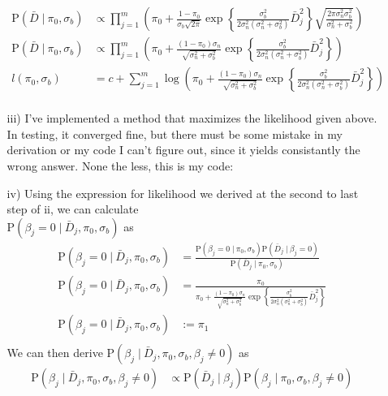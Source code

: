 \documentclass[11pt]{article}
\newcommand{\p}{\mathrm{P}}
\newcommand{\st}{ \; \big | \:}
\theoremstyle{definition}
\begin{document}
\begin{itemize}
\begin{itemize}
\begin{align*}
                    \p(\bar D\st \pi_0,\sigma_b) &\propto \prod_{j=1}^m\left(\pi_0 + \frac{1-\pi_0}{\sigma_b\sqrt{2\pi}}\exp\left\{\frac{\sigma_b^2}{2\sigma_n^2(\sigma_n^2+\sigma_b^2)}\bar D_j^2\right\}  \sqrt{\frac{2\pi\sigma_n^2\sigma_b^2}{\sigma_n^2+\sigma_b^2}}\right) \\
                    \p(\bar D\st \pi_0,\sigma_b) &\propto \prod_{j=1}^m\left(\pi_0 + \frac{(1-\pi_0)\sigma_n}{\sqrt{\sigma_n^2+\sigma_b^2}}\exp\left\{\frac{\sigma_b^2}{2\sigma_n^2(\sigma_n^2+\sigma_b^2)}\bar D_j^2\right\}  \right) \\
                    l(\pi_0,\sigma_b) &= c +  \sum_{j=1}^m\log\left(\pi_0 + \frac{(1-\pi_0)\sigma_n}{\sqrt{\sigma_n^2+\sigma_b^2}}\exp\left\{\frac{\sigma_b^2}{2\sigma_n^2(\sigma_n^2+\sigma_b^2)}\bar D_j^2\right\}  \right) \\
                \end{align*}
            \item[iii)]
                I've implemented a method that maximizes the likelihood given above. In testing, it converged fine, but there must be some mistake in my derivation or my code I can't figure out, since it yields consistantly the wrong answer. None the less, this is my code:
                
            \item[iv)]
                Using the expression for likelihood we derived at the second to last step of ii, we can calculate \\ $\p(\beta_j=0\st \bar D_j, \pi_0, \sigma_b)$ as 
                \begin{align*}
                    \p(\beta_j=0\st \bar D_j, \pi_0, \sigma_b) &= \frac{\p(\beta_j=0\st \pi_0, \sigma_b)\p(\bar D_j \st \beta_j=0)}{\p( \bar D_j \st \pi_0, \sigma_b)} \\
                    \p(\beta_j=0\st \bar D_j, \pi_0, \sigma_b) &= \frac{\pi_0}{ \pi_0 + \frac{(1-\pi_0)\sigma_n}{\sqrt{\sigma_n^2+\sigma_b^2}}\exp\left\{\frac{\sigma_b^2}{2\sigma_n^2(\sigma_n^2+\sigma_b^2)}\bar D_j^2\right\} } \\
                    \p(\beta_j=0\st \bar D_j, \pi_0, \sigma_b) &:= \pi_1 \\
                \end{align*}
                We can then derive $\p(\beta_j\st \bar D_j, \pi_0, \sigma_b,\beta_j\neq0)$ as 
                \begin{align*}
                    \p(\beta_j\st \bar D_j, \pi_0, \sigma_b, \beta_j\neq 0) &\propto  \p(\bar D_j\st \beta_j) \p(\beta_j \st \pi_0, \sigma_b, \beta_j\neq 0) \\

\end{align*}
\end{itemize}
\end{itemize}
\end{document}
